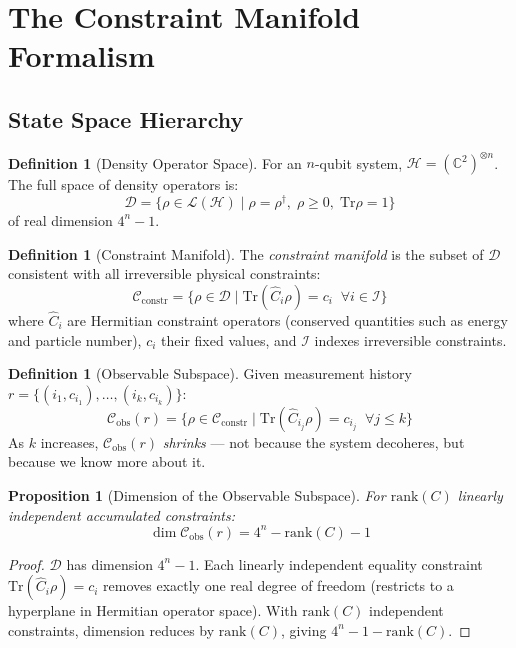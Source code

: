 \documentclass[12pt,letterpaper]{article}
\theoremstyle{plain}
\newtheorem{proposition}[theorem]{Proposition}
\theoremstyle{definition}
\newtheorem{definition}[theorem]{Definition}
\theoremstyle{remark}
\newcommand{\Hilb}{\mathcal{H}}
\newcommand{\Cconstr}{\mathcal{C}_{\mathrm{constr}}}
\newcommand{\Cdensity}{\mathcal{D}}
\newcommand{\Cobs}{\mathcal{C}_{\mathrm{obs}}}
\newcommand{\Cirr}{\mathcal{I}}
\newcommand{\rank}{\mathrm{rank}}
\begin{document}
\section{The Constraint Manifold Formalism}
\label{sec:constraint_manifold}

\subsection{State Space Hierarchy}

\begin{definition}[Density Operator Space]
For an $n$-qubit system, $\Hilb = (\mathbb{C}^2)^{\otimes n}$.
The full space of density operators is:
\begin{equation}
  \Cdensity = \bigl\{\rho\in\mathcal{L}(\Hilb)\mid
  \rho=\rho^\dagger,\;\rho\geq0,\;\mathrm{Tr}\rho=1\bigr\}
  \tag{B1.1}
\end{equation}
of real dimension $4^n - 1$.
\end{definition}

\begin{definition}[Constraint Manifold]
The \emph{constraint manifold} is the subset of $\Cdensity$ consistent
with all irreversible physical constraints:
\begin{equation}
  \Cconstr = \bigl\{\rho\in\Cdensity\mid
  \mathrm{Tr}(\hat{C}_i\rho)=c_i\;\;\forall i\in\Cirr\bigr\}
  \tag{B1.2}
\end{equation}
where $\hat{C}_i$ are Hermitian constraint operators (conserved
quantities such as energy and particle number), $c_i$ their fixed
values, and $\Cirr$ indexes irreversible constraints.
\end{definition}

\begin{definition}[Observable Subspace]
Given measurement history $r = \{(i_1,c_{i_1}),\ldots,(i_k,c_{i_k})\}$:
\begin{equation}
  \Cobs(r) = \bigl\{\rho\in\Cconstr\mid
  \mathrm{Tr}(\hat{C}_{i_j}\rho)=c_{i_j}\;\;\forall j\leq k\bigr\}
  \tag{B1.3}
\end{equation}
As $k$ increases, $\Cobs(r)$ \emph{shrinks} --- not because the
system decoheres, but because we know more about it.
\end{definition}

\begin{proposition}[Dimension of the Observable Subspace]
\label{prop:dim}
For $\rank(C)$ linearly independent accumulated constraints:
\begin{equation}
  \dim\Cobs(r) = 4^n - \rank(C) - 1
  \tag{B1.4}
  \label{eq:dim}
\end{equation}
\end{proposition}
\begin{proof}
$\Cdensity$ has dimension $4^n - 1$. Each linearly independent equality
constraint $\mathrm{Tr}(\hat{C}_i\rho)=c_i$ removes exactly one real
degree of freedom (restricts to a hyperplane in Hermitian operator space).
With $\rank(C)$ independent constraints, dimension reduces by $\rank(C)$,
giving $4^n - 1 - \rank(C)$.
\end{proof}
\end{document}
